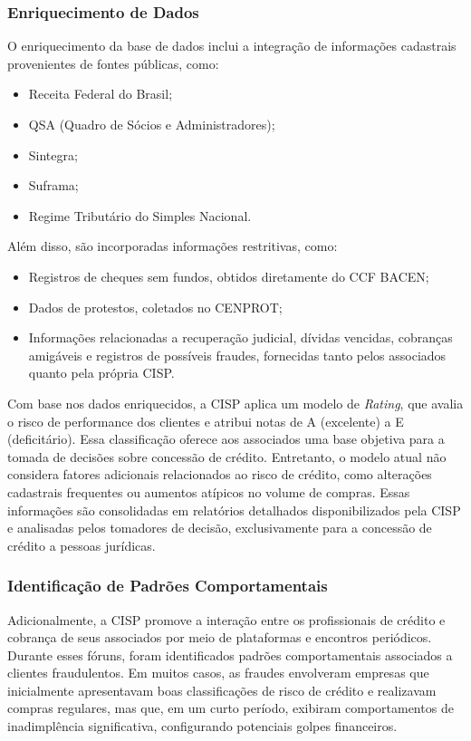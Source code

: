 \documentclass[12pt,a4paper]{article}
\begin{document}
\subsubsection{Enriquecimento de Dados}

O enriquecimento da base de dados inclui a integração de informações cadastrais provenientes de fontes públicas, como:
\begin{itemize}
    \item Receita Federal do Brasil;
    \item QSA (Quadro de Sócios e Administradores);
    \item Sintegra;
    \item Suframa;
    \item Regime Tributário do Simples Nacional.
\end{itemize}

Além disso, são incorporadas informações restritivas, como:
\begin{itemize}
    \item Registros de cheques sem fundos, obtidos diretamente do CCF BACEN;
    \item Dados de protestos, coletados no CENPROT;
    \item Informações relacionadas a recuperação judicial, dívidas vencidas, cobranças amigáveis e registros de possíveis fraudes, fornecidas tanto pelos associados quanto pela própria CISP.
\end{itemize}

Com base nos dados enriquecidos, a CISP aplica um modelo de \textit{Rating}, que avalia o risco de performance dos clientes e atribui notas de A (excelente) a E (deficitário). Essa classificação oferece aos associados uma base objetiva para a tomada de decisões sobre concessão de crédito. Entretanto, o modelo atual não considera fatores adicionais relacionados ao risco de crédito, como alterações cadastrais frequentes ou aumentos atípicos no volume de compras. Essas informações são consolidadas em relatórios detalhados disponibilizados pela CISP e analisadas pelos tomadores de decisão, exclusivamente para a concessão de crédito a pessoas jurídicas.

\subsubsection{Identificação de Padrões Comportamentais}

Adicionalmente, a CISP promove a interação entre os profissionais de crédito e cobrança de seus associados por meio de plataformas e encontros periódicos. Durante esses fóruns, foram identificados padrões comportamentais associados a clientes fraudulentos. Em muitos casos, as fraudes envolveram empresas que inicialmente apresentavam boas classificações de risco de crédito e realizavam compras regulares, mas que, em um curto período, exibiram comportamentos de inadimplência significativa, configurando potenciais golpes financeiros.
\end{document}
